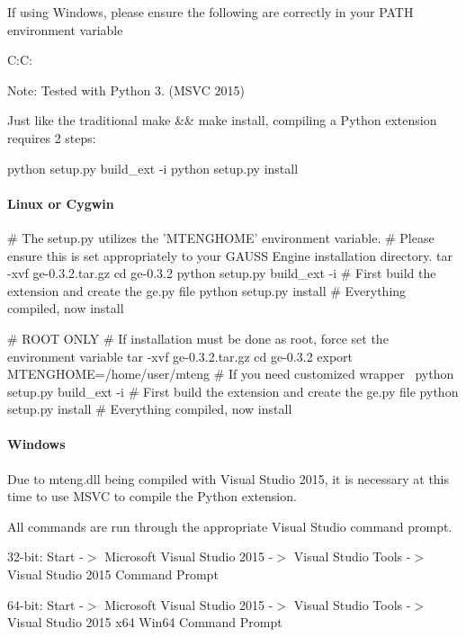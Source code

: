If using Windows, please ensure the following are correctly in your {\ttfamily P\+A\+TH} environment variable \begin{DoxyVerb}C:\;C:\Scripts\
\end{DoxyVerb}


Note\+: Tested with Python 3. (M\+S\+VC 2015)

Just like the traditional {\ttfamily make \&\& make install}, compiling a Python extension requires 2 steps\+:


\begin{DoxyCode}
python setup.py build\_ext -i
python setup.py install
\end{DoxyCode}


\paragraph*{Linux or Cygwin}


\begin{DoxyCode}
# The setup.py utilizes the 'MTENGHOME' environment variable.
# Please ensure this is set appropriately to your GAUSS Engine installation directory.
tar -xvf ge-0.3.2.tar.gz
cd ge-0.3.2
python setup.py build\_ext -i      # First build the extension and create the ge.py file
python setup.py install           # Everything compiled, now install

# ROOT ONLY
# If installation must be done as root, force set the environment variable
tar -xvf ge-0.3.2.tar.gz
cd ge-0.3.2
export MTENGHOME=/home/user/mteng
# If you need customized wrapper~
python setup.py build\_ext -i # First build the extension and create the ge.py file
python setup.py install      # Everything compiled, now install
\end{DoxyCode}


\paragraph*{Windows}

Due to {\ttfamily mteng.\+dll} being compiled with Visual Studio 2015, it is necessary at this time to use M\+S\+VC to compile the Python extension.

All commands are run through the appropriate Visual Studio command prompt.

32-\/bit\+: {\ttfamily Start -\/$>$ Microsoft Visual Studio 2015 -\/$>$ Visual Studio Tools -\/$>$ Visual Studio 2015 Command Prompt}

64-\/bit\+: {\ttfamily Start -\/$>$ Microsoft Visual Studio 2015 -\/$>$ Visual Studio Tools -\/$>$ Visual Studio 2015 x64 Win64 Command Prompt}


